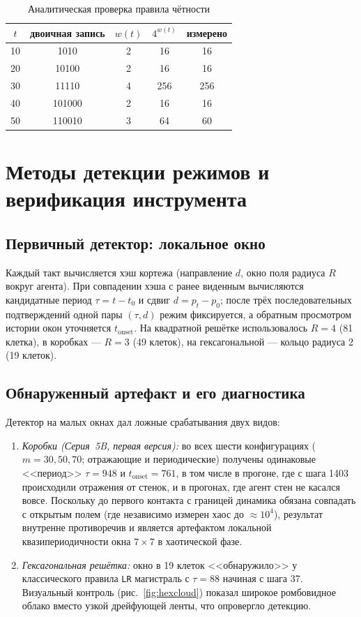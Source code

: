 \documentclass[12pt,a4paper]{article}
\begin{document}
	\begin{table}[H]
		\centering
		\caption{Аналитическая проверка правила чётности}
		\label{tab:parity}
		\begin{tabular}{ccccc}
			\toprule
			$t$ & двоичная запись & $w(t)$ & $4^{w(t)}$ & измерено \\
			\midrule
			10 & 1010   & 2 & 16  & 16  \\
			20 & 10100  & 2 & 16  & 16  \\
			30 & 11110  & 4 & 256 & 256 \\
			40 & 101000 & 2 & 16  & 16  \\
			50 & 110010 & 3 & 64  & 60  \\
			\bottomrule
		\end{tabular}
	\end{table}
	
	\section{Методы детекции режимов и верификация инструмента}
	
	\subsection{Первичный детектор: локальное окно}
	Каждый такт вычисляется хэш кортежа (направление $d$, окно поля радиуса $R$ вокруг агента). При совпадении хэша с ранее виденным вычисляются кандидатные период $\tau=t-t_0$ и сдвиг $d=p_t-p_{0}$; после трёх последовательных подтверждений одной пары $(\tau,d)$ режим фиксируется, а обратным просмотром истории окон уточняется $t_{\mathrm{onset}}$. На квадратной решётке использовалось $R=4$ (81 клетка), в коробках --- $R=3$ (49 клеток), на гексагональной --- кольцо радиуса 2 (19 клеток).
	
	\subsection{Обнаруженный артефакт и его диагностика}
	Детектор на малых окнах дал ложные срабатывания двух видов:
	\begin{enumerate}
		\item \emph{Коробки (Серия~5B, первая версия):} во всех шести конфигурациях ($m=30,50,70$; отражающие и периодические) получены одинаковые <<период>> $\tau=948$ и $t_{\mathrm{onset}}=761$, в том числе в прогоне, где с шага 1403 происходили отражения от стенок, и в прогонах, где агент стен не касался вовсе. Поскольку до первого контакта с границей динамика обязана совпадать с открытым полем (где независимо измерен хаос до $\approx10^4$), результат внутренне противоречив и является артефактом локальной квазипериодичности окна $7\times7$ в хаотической фазе. \item \emph{Гексагональная решётка:} окно в 19 клеток <<обнаружило>> у классического правила \texttt{LR} магистраль с $\tau=88$ начиная с шага 37. Визуальный контроль (рис.~\ref{fig:hexcloud}) показал широкое ромбовидное облако вместо узкой дрейфующей ленты, что опровергло детекцию.
	\end{enumerate}
	
\end{document}
